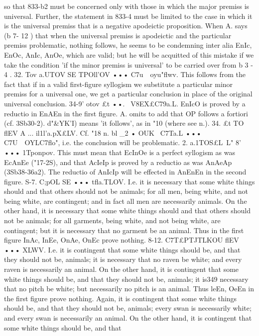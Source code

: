 {{{{{{{so that 833-b2 must be concerned only with those in which the
major premiss is universal. Further, the statement in 833-4 must
be limited to the case in which it is the universal premiss that is a
negative apodeictic proposition.
When A. says (b 7- 12 ) that when the universal premiss is
apodeictic and the particular premiss problematic, nothing
follows, he seems to be condemning inter alia EnIc, EnOc, AnIc,
AnOe, which are valid; but he will be acquitted of this mistake
if we take the condition 'if the minor premiss is universal' to be
carried over from b 3 - 4 .
32. Tov a.UTOV SE TPOll'OV ••• C7u~~oyu"flwv. This follows from
the fact that if in a valid first-figure syllogism we substitute a
particular minor premiss for a universal one, we get a particular
conclusion in place of the original universal conclusion.
34-9' otov £t ••. ~V8EX£C79a.L. EnIcO is proved by a reductio in
EnAEn in the first figure. A. omits to add that OP follows a
fortiori (cf. 3Sb30-2). d"&YK'I) means 'it follows', as in "10 (where
see n.).
34. £t TO flEV A ... il1l'a.pX£LV. Cf. "18 n.
bl _2 • OUK ~C7Ta.L ••• C7U~~OYLC7flo", i.e. the conclusion will be
problematic.
2. a.1TOS£L~L" 8' ••• 1Tponpov. This must mean that EcInOe is
a perfect syllogism as was EcAnEe ("17-2S), and that AcIeIp is
proved by a reductio as was AnAeAp (3Sb38-36a2). The reductio
of AnIcIp will be effected in AnEnEn in the second figure.
S-7. C;pOL SE ••• tfla.TLOV. I.e. it is necessary that some white
things should and that others should not be animals; for all men,
being white, and not being white, are contingent; and in fact
all men are necessarily animals. On the other hand, it is necessary
that some white things should and that others should not be
animals; for all garments, being white, and not being white, are
contingent; but it is necessary that no garment be an animal.
Thus in the first figure InAc, InEe, OnAe, OnEc prove nothing.
8-12. C7T£PTJTLKOU flEV ••• XLWV. I.e. it is contingent that some
white things should be, and that they should not be, animals; it
is necessary that no raven be white; and every raven is necessarily
an animal. On the other hand, it is contingent that some white
things should be, and that they should not be, animals; it is349
necessary that no pitch be white; but necessarily no pitch is
an animal. Thus leEn, OeEn in the first figure prove nothing.
Again, it is contingent that some white things should be, and
that they should not be, animals; every swan is necessarily
white; and every swan is necessarily an animal. On the other
hand, it is contingent that some white things should be, and that
}}}}}}}
